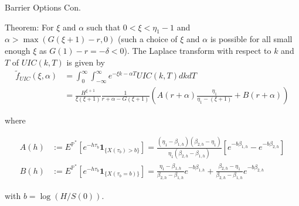 \documentclass{beamer}
\begin{document}
\begin{frame}{Barrier Options Con.}

    {\footnotesize \footnotesize
    \par Theorem:  For \(\xi\) and \(\alpha\) such that \(0 < \xi < \eta_1 - 1\) and \(\alpha > \max(G(\xi + 1) - r, 0)\) (such a choice of \(\xi\) and \(\alpha\) is possible 
    for all small enough \(\xi\) as \(G(1) - r = -\delta < 0\)). The Laplace transform with respect to \(k\) and \(T\) of \(UIC(k, T)\) is given by
    \begin{align*}
    \tilde{f}_{UIC}(\xi, \alpha) &= \int_{0}^{\infty} \int_{-\infty}^{\infty} e^{-\xi k - \alpha T} UIC(k, T) dk dT \\
    &= \frac{H^{\xi+1}}{\xi (\xi + 1)} \frac{1}{r + \alpha - G(\xi + 1)} \left( A(r + \alpha) \frac{\eta_1}{\eta_1 - (\xi + 1)} + B(r + \alpha) \right)
    \end{align*}
    \par  \pause where

    \begin{align*}
    A(h) &:= E^{\mathbb{P}^*} \left[ e^{-h\tau_b} \mathbf{1}_{\{X(\tau_b) > b\}} \right] =
     \frac{(\eta_1 - \beta_{1,h}) (\beta_{2,h} - \eta_1)}{\eta_1 (\beta_{2,h} - \beta_{1,h})} \left[ e^{-b\beta_{1,h}} - e^{-b\beta_{2,h}} \right]\\
    B(h) &:= E^{\mathbb{P}^*} \left[ e^{-h\tau_b} \mathbf{1}_{\{X(\tau_b = b)\}} \right] =
    \frac{\eta_1 - \beta_{1,h}}{\beta_{2,h} - \beta_{1,h}} e^{-b\beta_{1,h}} + \frac{\beta_{2,h} - \eta_1}{\beta_{2,h} - \beta_{1,h}} e^{-b\beta_{2,h}}
    \end{align*}
    \par with \(b = \log(H/S(0))\).
    }
    


\end{frame}
\end{document}
